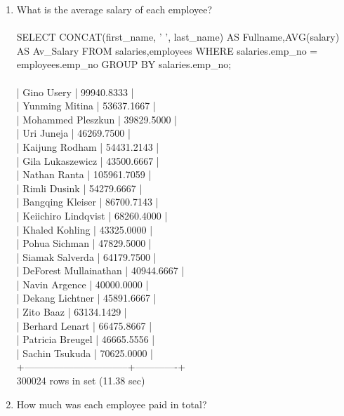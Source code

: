 \documentclass[]{article}
\begin{document}
\begin{enumerate}
\item What is the average salary of each employee?
\\\\	
SELECT CONCAT(first\_name, ' ', last\_name) AS Fullname,AVG(salary) AS Av\_Salary FROM salaries,employees
WHERE salaries.emp\_no = employees.emp\_no
GROUP BY salaries.emp\_no;
\\\\
| Gino Usery                     |  99940.8333 |
\\
| Yunming Mitina                 |  53637.1667 |
\\
| Mohammed Pleszkun              |  39829.5000 |
\\
| Uri Juneja                     |  46269.7500 |
\\
| Kaijung Rodham                 |  54431.2143 |
\\
| Gila Lukaszewicz               |  43500.6667 |
\\
| Nathan Ranta                   | 105961.7059 |
\\
| Rimli Dusink                   |  54279.6667 |
\\
| Bangqing Kleiser               |  86700.7143 |
\\
| Keiichiro Lindqvist            |  68260.4000 |
\\
| Khaled Kohling                 |  43325.0000 |
\\
| Pohua Sichman                  |  47829.5000 |
\\
| Siamak Salverda                |  64179.7500 |
\\
| DeForest Mullainathan          |  40944.6667 |
\\
| Navin Argence                  |  40000.0000 |
\\
| Dekang Lichtner                |  45891.6667 |
\\
| Zito Baaz                      |  63134.1429 |
\\
| Berhard Lenart                 |  66475.8667 |
\\
| Patricia Breugel               |  46665.5556 |
\\
| Sachin Tsukuda                 |  70625.0000 |
\\
+--------------------------------+-------------+
\\
300024 rows in set (11.38 sec)
\\
\item How much was each employee paid in total?
\\\\

\end{enumerate}
\end{document}
